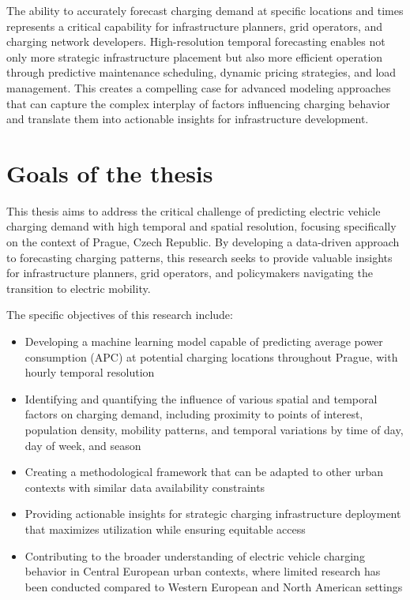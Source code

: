 The ability to accurately forecast charging demand at specific locations and times represents a critical capability for infrastructure planners, grid operators, and charging network developers. High-resolution temporal forecasting enables not only more strategic infrastructure placement but also more efficient operation through predictive maintenance scheduling, dynamic pricing strategies, and load management. This creates a compelling case for advanced modeling approaches that can capture the complex interplay of factors influencing charging behavior and translate them into actionable insights for infrastructure development.

\section{Goals of the thesis}

This thesis aims to address the critical challenge of predicting electric vehicle charging demand with high temporal and spatial resolution, focusing specifically on the context of Prague, Czech Republic. By developing a data-driven approach to forecasting charging patterns, this research seeks to provide valuable insights for infrastructure planners, grid operators, and policymakers navigating the transition to electric mobility.

The specific objectives of this research include:

\begin{itemize}
    \item Developing a machine learning model capable of predicting average power consumption (APC) at potential charging locations throughout Prague, with hourly temporal resolution

    \item Identifying and quantifying the influence of various spatial and temporal factors on charging demand, including proximity to points of interest, population density, mobility patterns, and temporal variations by time of day, day of week, and season

    \item Creating a methodological framework that can be adapted to other urban contexts with similar data availability constraints

    \item Providing actionable insights for strategic charging infrastructure deployment that maximizes utilization while ensuring equitable access

    \item Contributing to the broader understanding of electric vehicle charging behavior in Central European urban contexts, where limited research has been conducted compared to Western European and North American settings
\end{itemize}

